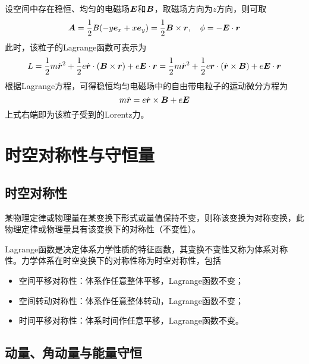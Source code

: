 \begin{example}[稳恒均匀电磁场中的自由带电粒子]
设空间中存在稳恒、均匀的电磁场$\boldsymbol{E}$和$\boldsymbol{B}$，取磁场方向为$z$方向，则可取
\begin{equation*}
	\boldsymbol{A} = \frac12 B(-y\boldsymbol{e}_x + x\boldsymbol{e}_y) = \frac12 \boldsymbol{B} \times \boldsymbol{r},\quad \phi = -\boldsymbol{E} \cdot \boldsymbol{r}
\end{equation*}
此时，该粒子的Lagrange函数可表示为
\begin{equation*}
	L = \frac12 m\dot{\boldsymbol{r}}^2 + \frac12 e\dot{\boldsymbol{r}} \cdot (\boldsymbol{B} \times \boldsymbol{r}) + e\boldsymbol{E} \cdot \boldsymbol{r} = \frac12 m\dot{\boldsymbol{r}}^2 + \frac12 e \boldsymbol{r} \cdot (\dot{\boldsymbol{r}} \times \boldsymbol{B}) + e\boldsymbol{E} \cdot \boldsymbol{r} 
\end{equation*}
根据Lagrange方程，可得稳恒均匀电磁场中的自由带电粒子的运动微分方程为
\begin{equation*}
	m \ddot{\boldsymbol{r}} = e\dot{\boldsymbol{r}} \times \boldsymbol{B} + e\boldsymbol{E}
\end{equation*}
上式右端即为该粒子受到的Lorentz力。
\end{example}

\section{时空对称性与守恒量}

\subsection{时空对称性}

某物理定律或物理量在某变换下形式或量值保持不变，则称该变换为{\heiti 对称变换}，此物理定律或物理量具有该变换下的{\heiti 对称性}（{\heiti 不变性}）。

Lagrange函数是决定体系力学性质的特征函数，其变换不变性又称为体系对称性。力学体系在时空变换下的对称性称为{\heiti 时空对称性}，包括
\begin{itemize}
	\item {\heiti 空间平移对称性}：体系作任意整体平移，Lagrange函数不变；
	\item {\heiti 空间转动对称性}：体系作任意整体转动，Lagrange函数不变；
	\item {\heiti 时间平移对称性}：体系时间作任意平移，Lagrange函数不变。
\end{itemize}

\subsection{动量、角动量与能量守恒}

